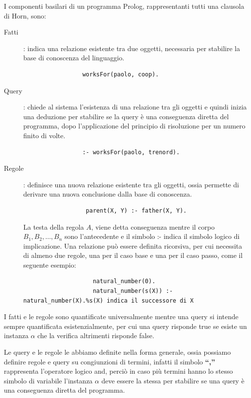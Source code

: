 I componenti basilari di un programma Prolog, rappresentanti tutti una clausola di Horn, sono:
\begin{description}
\item [Fatti]: indica una relazione esistente tra due oggetti, necessaria per stabilire la base di conoscenza del linguaggio.
               \begin{verbatim}
                 worksFor(paolo, coop).
               \end{verbatim}
\item [Query]: chiede al sistema l'esistenza di una relazione tra gli oggetti e quindi inizia una deduzione per stabilire se la query
               è una conseguenza diretta del programma, dopo l'applicazione del principio di risoluzione per un numero finito di volte.
               \begin{verbatim}
                 :- worksFor(paolo, trenord).
               \end{verbatim}

\item [Regole]: definisce una nuova relazione esistente tra gli oggetti, ossia permette di derivare una nuova conclusione dalla base di conoscenza.
                \begin{verbatim}
                  parent(X, Y) :- father(X, Y).
                \end{verbatim}
                La testa della regola $A$, viene detta conseguenza mentre il corpo $B_1, B_2, \dots, B_n$ sono l'antecedente
                e il simbolo :- indica il simbolo logico di implicazione.\newline
                Una relazione può essere definita ricorsiva, per cui necessita di almeno due regole, una per il caso base e
                una per il caso passo, come il seguente esempio:
                \begin{verbatim}
                    natural_number(0).
                    natural_number(s(X)) :- natural_number(X).%s(X) indica il successore di X
                \end{verbatim}
\end{description}
I fatti e le regole sono quantificate universalmente mentre una query si intende sempre quantificata esistenzialmente, per cui una query
risponde true se esiste un instanza $\alpha$ che la verifica altrimenti risponde false.

Le query e le regole le abbiamo definite nella forma generale, ossia possiamo definire regole e query su congiunzioni di termini,
infatti il simbolo \textbf{``,''} rappresenta l'operatore logico and, perciò in caso più termini hanno lo stesso simbolo di variabile
l'instanza $\alpha$ deve essere la stessa per stabilire se una query è una conseguenza diretta del programma.

